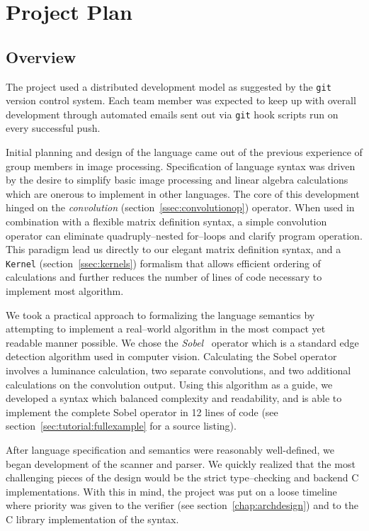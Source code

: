 \chapter{Project Plan}
\label{chap:projplan}

\section{Overview}
The \sys{} project used a distributed development model as suggested by the
\texttt{git}~\cite{git:website} version control system. Each team member was expected
to keep up with overall development through automated emails sent out via \texttt{git}
hook scripts run on every successful push.

Initial planning and design of the \sys{} language came out of the previous experience of
group members in image processing. Specification of language syntax was driven by the desire
to simplify basic image processing and linear algebra calculations which are onerous to
implement in other languages. The core of this development hinged on the \emph{convolution}
(section~\ref{ssec:convolutionop}) operator. When used in combination with a flexible matrix
definition syntax, a simple convolution operator can eliminate quadruply--nested for--loops and
clarify program operation. This paradigm lead us directly to our elegant matrix definition
syntax, and a \texttt{Kernel} (section~\ref{ssec:kernels}) formalism that allows efficient
ordering of calculations and further reduces the number of lines of code necessary to implement
most algorithm.

We took a practical approach to formalizing the language semantics by attempting to implement
a real--world algorithm in the most compact yet readable manner possible. We chose
the \emph{Sobel}~\cite{sobel:wikipedia} operator which is a standard edge detection algorithm
used in computer vision. Calculating the Sobel operator involves a luminance calculation,
two separate convolutions, and two additional calculations on the convolution output. Using
this algorithm as a guide, we developed a syntax which balanced complexity and readability,
and is able to implement the complete Sobel operator in 12 lines of code
(see section~\ref{sec:tutorial:fullexample} for a source listing).

After language specification and semantics were reasonably well-defined, we began development
of the scanner and parser. We quickly realized that the most challenging pieces of the \sys{}
design would be the strict type--checking and backend C implementations. With this in mind,
the project was put on a loose timeline where priority was given to the verifier
(see section~\ref{chap:archdesign}) and to the C library implementation of the \sys{} syntax.

